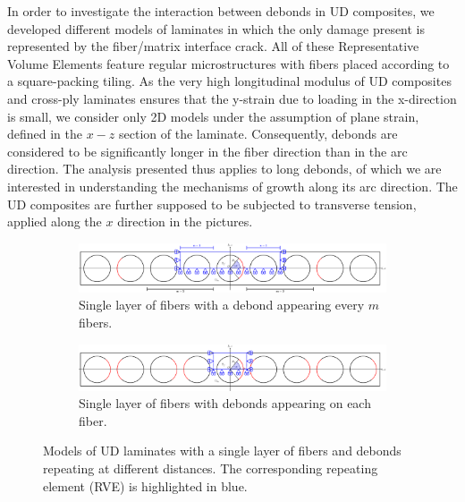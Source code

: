 \documentclass[review]{elsarticle}
\begin{document}
In order to investigate the interaction between debonds in UD composites, we developed different models of laminates in which the only damage present is represented by the fiber/matrix interface crack. All of these Representative Volume Elements feature regular microstructures with fibers placed according to a square-packing tiling. As the very high longitudinal modulus of UD composites and cross-ply laminates ensures that the y-strain due to loading in the x-direction is small, we consider only 2D models under the assumption of plane strain, defined in the $x-z$ section of the laminate. Consequently, debonds are considered to be significantly longer in the fiber direction than in the arc direction. The analysis presented thus applies to long debonds, of which we are interested in understanding the mechanisms of growth along its arc direction. The UD composites are further supposed to be subjected to transverse tension, applied along the $x$ direction in the pictures.

\begin{figure}[!h]
\centering
    \begin{subfigure}[b]{\textwidth}
        \includegraphics[width=\textwidth]{freeThinPly.pdf}
        \caption{Single layer of fibers with a debond appearing every $m$ fibers.}\label{subfig:freethinply}
    \end{subfigure}

    \begin{subfigure}[b]{\textwidth}
        \includegraphics[width=\textwidth]{freeThinPlyAllDebonds.pdf}
        \caption{Single layer of fibers with debonds appearing on each fiber.}\label{subfig:freethinplyalldebonds}
    \end{subfigure} 

\caption{Models of UD laminates with a single layer of fibers and debonds repeating at different distances. The corresponding repeating element (RVE) is highlighted in blue.}\label{fig:laminateModelsA}
\end{figure}
\end{document}
